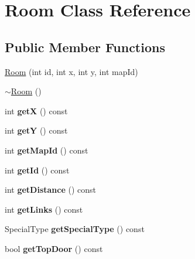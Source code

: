 \hypertarget{class_room}{\section{Room Class Reference}
\label{class_room}
}
\subsection*{Public Member Functions}
\begin{DoxyCompactItemize}
\item 
\hyperlink{class_room_aaef0b08fe3796290d4609470ddd9a0c4}{Room} (int id, int x, int y, int map\-Id)
\item 
\hyperlink{class_room_a67d5da09983cc53097807fd43ba5481a}{$\sim$\-Room} ()
\item 
\hypertarget{class_room_a067f0dbf1e1981f3f53692c454032bad}{int {\bfseries get\-X} () const }\label{class_room_a067f0dbf1e1981f3f53692c454032bad}

\item 
\hypertarget{class_room_a36707f281040aa8d27f13070b1a35b20}{int {\bfseries get\-Y} () const }\label{class_room_a36707f281040aa8d27f13070b1a35b20}

\item 
\hypertarget{class_room_ad36e96122696a31eec31a52ac99c4a4b}{int {\bfseries get\-Map\-Id} () const }\label{class_room_ad36e96122696a31eec31a52ac99c4a4b}

\item 
\hypertarget{class_room_a6f71af918166e1835662982219559d29}{int {\bfseries get\-Id} () const }\label{class_room_a6f71af918166e1835662982219559d29}

\item 
\hypertarget{class_room_a977bd80b8c374edb31eb467d191b7233}{int {\bfseries get\-Distance} () const }\label{class_room_a977bd80b8c374edb31eb467d191b7233}

\item 
\hypertarget{class_room_a63e8fe415cd7f3e7f327bf7603388638}{int {\bfseries get\-Links} () const }\label{class_room_a63e8fe415cd7f3e7f327bf7603388638}

\item 
\hypertarget{class_room_a97488664cbabc4cef3a63d18526b5fc0}{Special\-Type {\bfseries get\-Special\-Type} () const }\label{class_room_a97488664cbabc4cef3a63d18526b5fc0}

\item 
\hypertarget{class_room_ad490b94e5406c002c875b4a507674008}{bool {\bfseries get\-Top\-Door} () const }\label{class_room_ad490b94e5406c002c875b4a507674008}


\end{DoxyCompactItemize}
